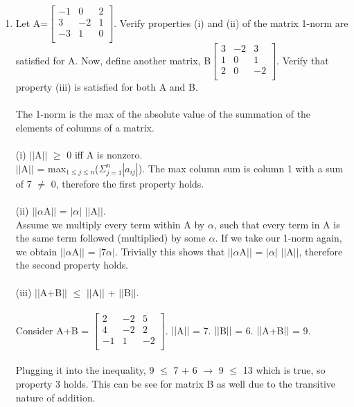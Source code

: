 \documentclass[12pt]{article}
\begin{document}
\begin{enumerate}
\item Let A=$\begin{bmatrix}
    -1 & 0 & 2\\
   3 & -2 & 1 \\
   -3 & 1 & 0 \\
\end{bmatrix}$. Verify properties (i) and (ii) of the matrix 1-norm are satisfied for A. Now, define another matrix, B$\begin{bmatrix}
    3 & -2 & 3\\
   1 & 0 & 1 \\
   2 & 0 & -2 \\
\end{bmatrix}$. Verify that property (iii) is satisfied for both A and B. \\ \\
The 1-norm is the max of the absolute value of the summation of the elements of columns of a matrix. \\ \\
(i) $||$A$||$ $\geq$ 0 iff A is nonzero. \\
$||$A$||$ = max$_{1\leq j\leq n}$($\Sigma_{j=1}^n |a_{ij}|$). The max column sum is column 1 with a sum of 7 $\neq$ 0, therefore the first property holds. \\ \\
(ii) $||\alpha$A$||$ = $|\alpha|$ $||$A$||$. \\
Assume we multiply every term within A by $\alpha$, such that every term in A is the same term followed (multiplied) by some $\alpha$. If we take our 1-norm again, we obtain $||\alpha$A$||$ = $|7\alpha|$. Trivially this shows that $||\alpha$A$||$ = $|\alpha|$ $||$A$||$, therefore the second property holds. \\ \\
(iii) $||$A+B$||$ $\leq$ $||$A$||$ + $||$B$||$. \\ \\
Consider A+B = $\begin{bmatrix}
    2 & -2 & 5\\
   4 & -2 & 2 \\
   -1 & 1 & -2 \\
\end{bmatrix}$. $||$A$||$ = 7. $||$B$||$ = 6. $||$A+B$||$ = 9.\\ \\ Plugging it into the inequality, 9 $\leq$ 7 + 6 $\rightarrow$ 9 $\leq$ 13 which is true, so property 3 holds. This can be see for matrix B as well due to the transitive nature of addition.\\

\end{enumerate}
\end{document}
